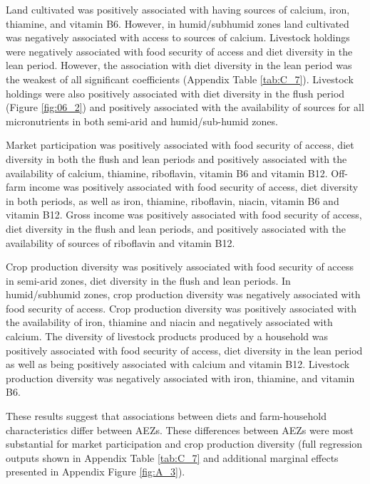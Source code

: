 Land cultivated was positively associated with having sources of calcium, iron, thiamine, and vitamin B6. However, in humid/subhumid zones land cultivated was negatively associated with access to sources of calcium. Livestock holdings were negatively associated with food security of access and diet diversity in the lean period. However, the association with diet diversity in the lean period was the weakest of all significant coefficients (Appendix Table \ref{tab:C_7}). Livestock holdings were also positively associated with diet diversity in the flush period (Figure \ref{fig:06_2}) and positively associated with the availability of sources for all micronutrients in both semi-arid and humid/sub-humid zones.

Market participation was positively associated with food security of access, diet diversity in both the flush and lean periods and positively associated with the availability of calcium, thiamine, riboflavin, vitamin B6 and vitamin B12. Off-farm income was positively associated with food security of access, diet diversity in both periods, as well as iron, thiamine, riboflavin, niacin, vitamin B6 and vitamin B12. Gross income was positively associated with food security of access, diet diversity in the flush and lean periods, and positively associated with the availability of sources of riboflavin and vitamin B12.

Crop production diversity was positively associated with food security of access in semi-arid zones, diet diversity in the flush and lean periods. In humid/subhumid zones, crop production diversity was negatively associated with food security of access. Crop production diversity was positively associated with the availability of iron, thiamine and niacin and negatively associated with calcium. The diversity of livestock products produced by a household was positively associated with food security of access, diet diversity in the lean period as well as being positively associated with calcium and vitamin B12. Livestock production diversity was negatively associated with iron, thiamine, and vitamin B6.

These results suggest that associations between diets and farm-household characteristics differ between AEZs. These differences between AEZs were most substantial for market participation and crop production diversity (full regression outputs shown in Appendix Table \ref{tab:C_7} and additional marginal effects presented in Appendix Figure \ref{fig:A_3}).


